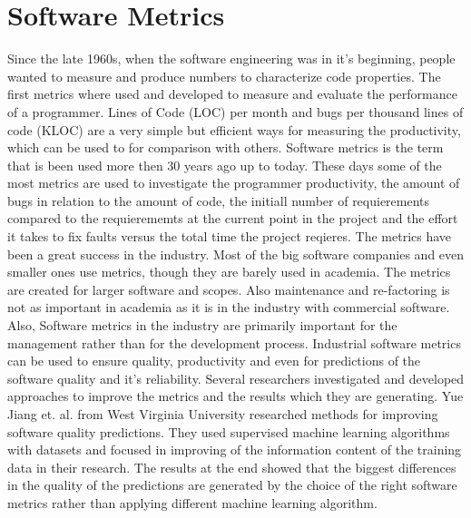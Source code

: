 \section{Software Metrics}
Since the late 1960s, when the software engineering was in it's beginning, people wanted to measure and produce numbers to characterize code properties. 
The first metrics where used and developed to measure and evaluate the performance of a programmer. Lines of Code (LOC) per month and bugs per thousand lines of code (KLOC) are a very simple but efficient ways for measuring the productivity, which can be used to for comparison with others.
Software metrics is the term that is been used more then 30 years ago up to today. 
These days some of the most metrics are used to investigate the programmer productivity, the amount of bugs in relation to the amount of code, the initiall number of requierements compared to the requierememts at the current point in the project and the effort it takes to fix faults versus the total time the project reqieres. \cite{kaner2004software}
The metrics have been a great success in the industry. Most of the big software companies and even smaller ones use metrics, though they are barely used in academia. 
The metrics are created for larger software and scopes. Also maintenance and re-factoring is not as important in academia as it is in the industry with commercial software. Also, Software metrics in the industry are primarily important for the management rather than for the development process. 
Industrial software metrics can be used to ensure quality, productivity and even for predictions of the software quality and it's reliability. 
\cite{fenton1999software}
Several researchers investigated and developed approaches to improve the metrics and the results which they are generating. 
Yue Jiang et. al. from West Virginia University researched methods for improving software quality predictions. They used supervised machine learning algorithms with datasets and focused in improving of the information content of the training data in their research. The results at the end showed that the biggest differences in the quality of the predictions are generated by the choice of the right software metrics rather than applying different machine learning algorithm. 
\cite{jiang2008comparing} 

